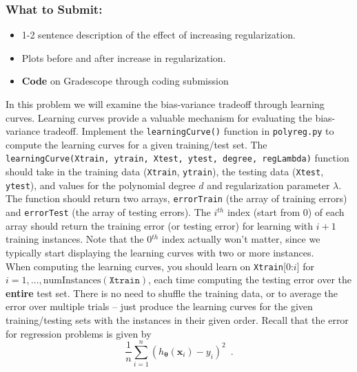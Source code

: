 \documentclass{article}
\begin{document}
\begin{aprob}
    \subsubsection*{What to Submit:}
    \begin{itemize}
        \item 1-2 sentence description of the effect of increasing regularization.
        \item Plots before and after increase in regularization.
        \item \textbf{Code} on Gradescope through coding submission
    \end{itemize}
\end{aprob}

\begin{aprob}
     In this problem we will examine the bias-variance tradeoff through learning curves. Learning curves provide a valuable mechanism for evaluating the bias-variance tradeoff. Implement the \texttt{learningCurve()} function in \texttt{polyreg.py} to compute the learning curves for a given training/test set.  The \texttt{learningCurve(Xtrain, ytrain, Xtest, ytest, degree, regLambda)} function should take in the training data (\texttt{Xtrain}, \texttt{ytrain}), the testing data (\texttt{Xtest}, \texttt{ytest}), and values for the polynomial degree $d$ and regularization parameter $\lambda$. The function should return two arrays, \texttt{errorTrain} (the array of training errors) and \texttt{errorTest} (the array of testing errors).  The $i^{th}$ index (start from 0) of each array should return the training error (or testing error) for learning with $i +1$ training instances.  Note that the 0$^{th}$ index actually won't matter, since we typically start displaying the learning curves with two or more instances.\\
    
    When computing the learning curves, you should learn on \texttt{Xtrain}[0:$i$] for $i = 1, \ldots, \text{numInstances}(\texttt{Xtrain})$, each time computing the testing error over the {\bf entire} test set.  There is no need to shuffle the training data, or to average the error over multiple trials -- just produce the learning curves for the given training/testing sets with the instances in their given order.  Recall that the error for regression problems is given by
    \begin{equation}
        \frac{1}{n} \sum_{i=1}^n (h_{\bm{\theta}}(\mathbf{x}_i) - y_i)^2 \enspace.
    \end{equation}
    

\end{aprob}
\end{document}
